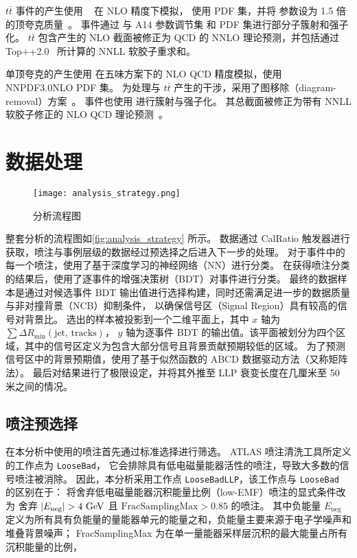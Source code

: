 $t\bar{t}$ 事件的产生使用 \POWHEGBOX[v2]~\cite{POWHEG_BOX} 在 NLO 精度下模拟，
使用 \NNPDF[3.0NLO] PDF 集，并将 \hdamp 参数设为 1.5 倍的顶夸克质量~\cite{ATL-PHYS-PUB-2016-020}。
事件通过 \Pythia[8.230] 与 A14 参数调节集 和 \NNPDF[2.3LO] PDF 集进行部分子簇射和强子化。
$t\bar{t}$ 包含产生的 NLO 截面被修正为 QCD 的 NNLO 理论预测，并包括通过 Top++2.0~\cite{Beneke:2011mq} 所计算的 NNLL 软胶子重求和。

单顶夸克的产生使用 \POWHEGBOX[v2] 在五味方案下的 NLO QCD 精度模拟，使用 NNPDF3.0NLO PDF 集。
为处理与 $t\bar{t}$ 产生的干涉，采用了图移除（diagram-removal）方案~\cite{Frixione:2008yi}。
事件也使用  进行簇射与强子化。
其总截面被修正为带有 NNLL 软胶子修正的 NLO QCD 理论预测~\cite{Aliev:2010zk}。


\section{数据处理}
\begin{figure}[ht]
    \centering
    \texttt{[image: analysis\_strategy.png]}
    \caption{分析流程图\cite{ATLAS:2022zhj}}
    \label{fig:analysis_strategy}
\end{figure}

整套分析的流程图如\autoref{fig:analysis_strategy} 所示。
数据通过 CalRatio 触发器进行获取，喷注与事例层级的数据经过预选择之后进入下一步的处理。
对于事件中的每一个喷注，使用了基于深度学习的神经网络（NN）进行分类。
在获得喷注分类的结果后，使用了逐事件的增强决策树（BDT）对事件进行分类。
最终的数据样本是通过对候选事件 BDT 输出值进行选择构建，同时还需满足进一步的数据质量与非对撞背景（NCB）抑制条件，
以确保信号区（Signal Region）具有较高的信号对背景比。
选出的样本被投影到一个二维平面上，其中 $x$ 轴为 $\sum \Delta R_{\min}(\text{jet, tracks})$，
$y$ 轴为逐事件 BDT 的输出值。该平面被划分为四个区域，其中的信号区定义为包含大部分信号且背景贡献预期较低的区域。
为了预测信号区中的背景预期值，使用了基于似然函数的 ABCD 数据驱动方法（又称矩阵法）。
最后对结果进行了极限设定，并将其外推至 LLP 衰变长度在几厘米至 50 米之间的情况。


\subsection{喷注预选择}
\label{sec:jet_preselection}

在本分析中使用的喷注首先通过标准选择进行筛选。
ATLAS 喷注清洗工具所定义的工作点为 \texttt{LooseBad}\cite{ATLAS-CONF-2015-029}，
它会排除具有低电磁量能器活性的喷注，导致大多数的信号喷注被消除。
因此，本分析采用工作点 \texttt{LooseBadLLP}，该工作点与 \texttt{LooseBad} 的区别在于：
将舍弃低电磁量能器沉积能量比例（low-EMF）喷注的显式条件改为
舍弃 $ |E_{\text{neg}}| > 4~\text{GeV} $ 且 \(\text{FracSamplingMax} > 0.85\) 的喷注。
其中负能量 $E_{\text{neg}}$ 定义为所有具有负能量的量能器单元的能量之和，负能量主要来源于电子学噪声和堆叠背景噪声；
FracSamplingMax 为在单一量能器采样层沉积的最大能量占所有沉积能量的比例，

